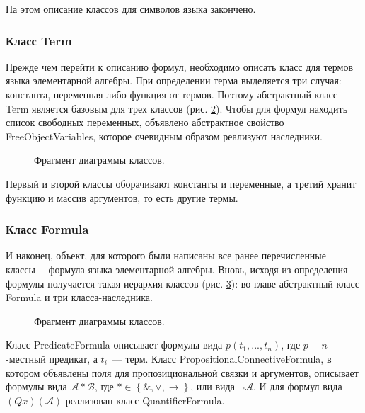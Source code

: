 \begin{figure}[h]
    \caption{}
    \label{fig:Const}
\end{figure}

На этом описание классов для символов языка закончено.

\subsubsection{Класс Term}

Прежде чем перейти к описанию формул, необходимо описать класс для термов языка элементарной алгебры. При определении терма выделяется три случая: константа, переменная либо функция от термов. Поэтому абстрактный класс Term является базовым для трех классов (рис. \ref{fig:Term}). Чтобы для формул находить список свободных переменных, объявлено абстрактное свойство FreeObjectVariables, которое очевидным образом реализуют наследники.

\begin{figure}[ht]
    \caption{Фрагмент диаграммы классов.}
    \label{fig:Term}
\end{figure}

Первый и второй классы оборачивают константы и переменные, а третий хранит функцию и массив аргументов, то есть другие термы.

\subsubsection{Класс Formula}

И наконец, объект, для которого были написаны все ранее перечисленные классы~-- формула языка элементарной алгебры. Вновь, исходя из определения формулы получается такая иерархия классов (рис. \ref{fig:Formula}): во главе абстрактный класс Formula и три класса-наследника.

\begin{figure}[h]
    \caption{Фрагмент диаграммы классов.}
    \label{fig:Formula}
\end{figure}

Класс PredicateFormula описывает формулы вида $p\left(t_1, ... , t_n\right)$, где $p$~-- $n$-местный предикат, а $t_i$~--- терм. Класс PropositionalConnectiveFormula, в котором объявлены поля для пропозициональной связки и аргументов, описывает формулы вида $\mathcal{A} * \mathcal{B}$, где $* \in \left\{\&, \lor, \to\right\}$, или вида $\neg \mathcal{A}$. И для формул вида $(Qx)(\mathcal{A})$ реализован класс QuantifierFormula.

